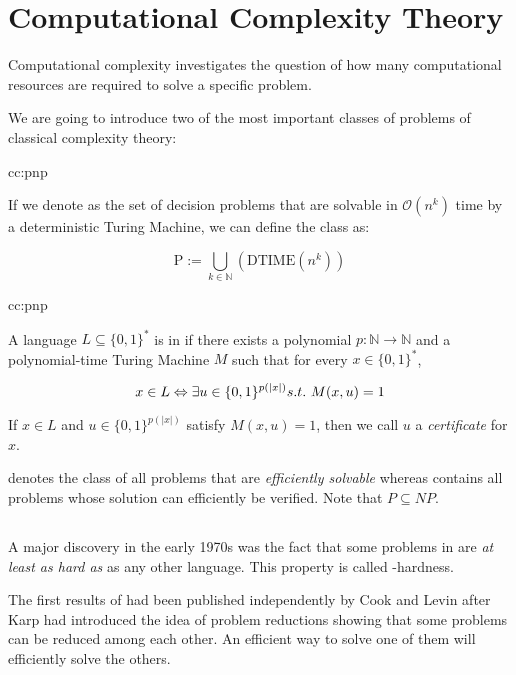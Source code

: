 \section{Computational Complexity Theory}

Computational complexity investigates the question of how many computational resources are required to solve a specific problem. 

We are going to introduce two of the most important classes of problems of classical complexity theory:

\begin{cc}{cc:pnp}

    If we denote \DTIME as the set of decision problems that are solvable in $\mathcal{O}(n^k)$ time by a deterministic Turing Machine, we can define the class \Pt as:

    \[ \mathrm{P} := \bigcup_{k \in \mathbb{N}}(\mathrm{DTIME}(n^k))\]

\end{cc}

\begin{cc}{cc:pnp}

    A language $L \subseteq \{0,1\}^*$ is in \Pt if there exists a polynomial $p: \mathbb{N} \rightarrow \mathbb{N}$ and a polynomial-time Turing Machine $M$ such that for every $x \in \{0,1\}^*$,

    \[ x \in L \Leftrightarrow \exists u \in \{0,1\}^{p(|x|)} \mathnormal{s.t.~} M(x,u) = 1 \]

    \noindent If $x \in L$ and $u \in \{ 0,1 \}^{p(|x|)}$ satisfy $M(x,u) = 1$, then we call $u$  a \textit{certificate} for $x$.
\end{cc}

\Pt denotes the class of all problems that are \textit{efficiently solvable} whereas \NP contains all problems whose solution can efficiently be verified. Note that $P \subseteq NP$.

\subsection{\NPcn}
A major discovery in the early 1970s was the fact that some problems in \NP are \textit{at least as hard as} as any other language.
This property is called \NP-hardness.

The first results of \NPcn had been published independently by Cook \cite{Cook1971} and Levin \cite{Levin1973} after Karp \cite{Karp1972} had introduced the idea of problem reductions showing that some problems can be reduced among each other.
An efficient way to solve one of them will efficiently solve the others. 

